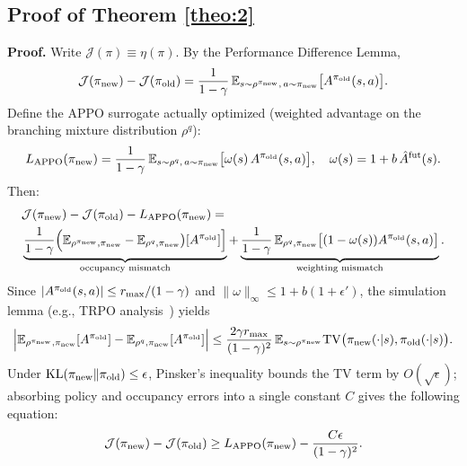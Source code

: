 \documentclass{llmxive}
\begin{document}
\subsection{Proof of Theorem \ref{theo:2}}
\label{proof:theorem2}
\textbf{Proof.}
Write $\mathcal{J}(\pi)\equiv\eta(\pi)$. By the Performance Difference Lemma,
\begin{equation}\label{eq:pdl2}
\mathcal{J}(\pi_{\rm new})-\mathcal{J}(\pi_{\rm old})
=\frac{1}{1-\gamma}\,
\mathbb{E}_{s\sim\rho^{\pi_{\rm new}},\,a\sim\pi_{\rm new}}
\big[A^{\pi_{\rm old}}(s,a)\big].
\end{equation}
Define the APPO surrogate actually optimized (weighted advantage on the
branching mixture distribution $\rho^q$):
\begin{equation}
L_{\rm APPO}(\pi_{\rm new})
=\frac{1}{1-\gamma}\,
\mathbb{E}_{s\sim\rho^{q},\,a\sim\pi_{\rm new}}
\big[\omega(s)\,A^{\pi_{\rm old}}(s,a)\big],
\quad \omega(s)=1+b\,\hat{A}^{\rm fut}(s).
\end{equation}
Then:
\begin{equation}\label{eq:x}
\begin{split}
   & \mathcal{J}(\pi_{\rm new})-\mathcal{J}(\pi_{\rm old})-L_{\rm APPO}(\pi_{\rm new})
= \\
&\underbrace{\frac{1}{1-\gamma}\Big(
\mathbb{E}_{\rho^{\pi_{\rm new}},\pi_{\rm new}}-\mathbb{E}_{\rho^{q},\pi_{\rm new}}
\big)[A^{\pi_{\rm old}}]\Big]}_{\text{occupancy mismatch}}
+\underbrace{\frac{1}{1-\gamma}\,
\mathbb{E}_{\rho^{q},\pi_{\rm new}}
\big[(1-\omega(s))A^{\pi_{\rm old}}(s,a)\big]}_{\text{weighting mismatch}}.
\end{split} 
\end{equation}
Since $|A^{\pi_{\rm old}}(s,a)|\le r_{\max}/(1-\gamma)$ and
$\|\omega\|_\infty\le 1+b(1+\epsilon')$, the simulation lemma
(e.g., TRPO analysis~\cite{schulman2017proximal,agarwal2019reinforcement}) yields
\begin{equation}
\Big|\mathbb{E}_{\rho^{\pi_{\rm new}},\pi_{\rm new}}[A^{\pi_{\rm old}}]
-\mathbb{E}_{\rho^{q},\pi_{\rm new}}[A^{\pi_{\rm old}}]\Big|
\le \frac{2\gamma r_{\max}}{(1-\gamma)^2}\,
\mathbb{E}_{s\sim\rho^{\pi_{\rm new}}}
\mathrm{TV}\big(\pi_{\rm new}(\cdot|s),\pi_{\rm old}(\cdot|s)\big).
\end{equation}
Under $\mathrm{KL}(\pi_{\rm new}\|\pi_{\rm old})\le\epsilon$,
Pinsker's inequality bounds the TV term by $O(\sqrt{\epsilon})$;
absorbing policy and occupancy errors into a single constant $C$ gives the following equation:
\begin{equation}
\mathcal{J}(\pi_{\rm new})-\mathcal{J}(\pi_{\rm old})
\ge L_{\rm APPO}(\pi_{\rm new})
-\frac{C\epsilon}{(1-\gamma)^2}.
\end{equation} 
 
\end{document}
